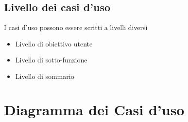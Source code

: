 \subsection{Livello dei casi d'uso}
I casi d'uso possono essere scritti a livelli diversi
\begin{itemize}
    \item Livello di obiettivo utente
    \item Livello di sotto-funzione
    \item Livello di sommario
\end{itemize}

\section{Diagramma dei Casi d'uso}

